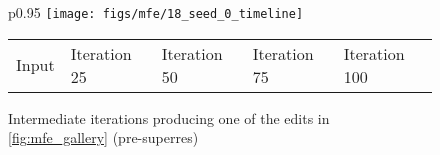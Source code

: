 \begin{figure*}
    \centering
  \begin{tabular}{p{}}
  \hspace{5mm}
    \texttt{[image: figs/mfe/18\_seed\_0\_timeline]}\\ 
    \hspace{5mm}
    \begin{tabularx}{150mm}{p{25mm}p{25mm}p{25mm}p{25mm}p{25mm}}
    Input  &
    Iteration 25 &
    Iteration 50 &
    Iteration 75 &
    Iteration 100
    \end{tabularx}
  \end{tabular}
    \caption{Intermediate iterations producing one of the edits in \cref{fig:mfe_gallery} (pre-superres)}
    \label{fig:edit_iter}
\end{figure*}

